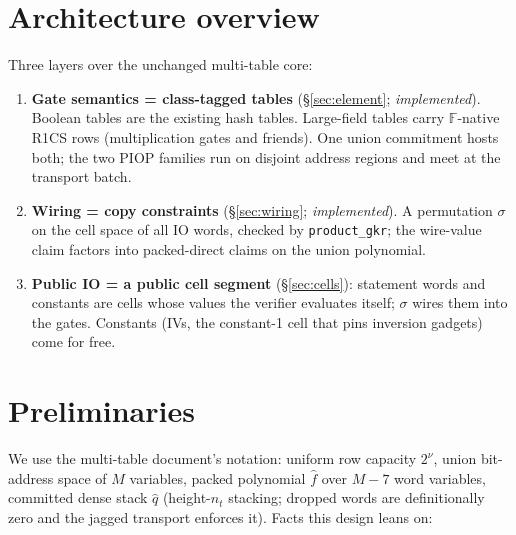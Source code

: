 \documentclass[11pt]{article}
\newcommand{\F}{\mathbb{F}}
\newcommand{\code}[1]{\texttt{#1}}
\theoremstyle{definition}
\begin{document}
\section{Architecture overview}\label{sec:arch}

Three layers over the unchanged multi-table core:

\begin{enumerate}[nosep]
  \item \textbf{Gate semantics = class-tagged tables}
        (\S\ref{sec:element}; \emph{implemented}). Boolean tables are the
        existing hash tables. Large-field tables carry $\F$-native R1CS
        rows (multiplication gates and friends). One union commitment
        hosts both; the two PIOP families run on disjoint address regions
        and meet at the transport batch.
  \item \textbf{Wiring = copy constraints} (\S\ref{sec:wiring};
        \emph{implemented}). A permutation $\sigma$ on the cell space of all
        IO words, checked by \code{product\_gkr}; the wire-value claim
        factors into packed-direct claims on the union polynomial.
  \item \textbf{Public IO = a public cell segment} (\S\ref{sec:cells}):
        statement words and constants are cells whose values the verifier
        evaluates itself; $\sigma$ wires them into the gates. Constants
        (IVs, the constant-1 cell that pins inversion gadgets) come for
        free.
\end{enumerate}

\section{Preliminaries}\label{sec:prelim}

We use the multi-table document's notation: uniform row capacity $2^\nu$,
union bit-address space of $M$ variables, packed polynomial $\hat f$ over
$M-7$ word variables, committed dense stack $\hat q$ (height-$n_t$
stacking; dropped words are definitionally zero and the jagged transport
enforces it). Facts this design leans on:
\end{document}
